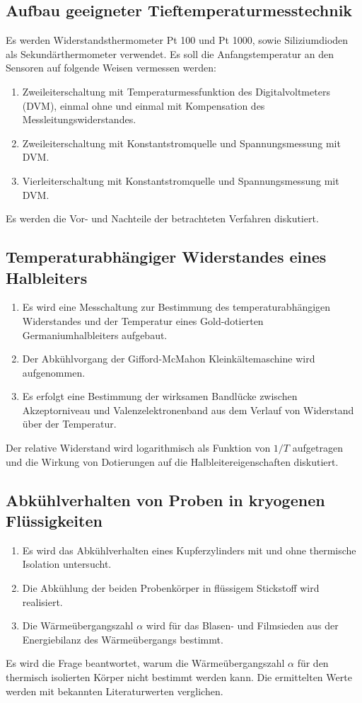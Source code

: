 \documentclass[parskip=half, a4paper,twoside,final]{article}
\begin{document}
\subsection{Aufbau geeigneter Tieftemperaturmesstechnik}

Es werden Widerstandsthermometer Pt 100 und Pt 1000, sowie Siliziumdioden als Sekundärthermometer verwendet. Es soll die Anfangstemperatur an den Sensoren auf folgende Weisen vermessen werden:
\begin{enumerate}
  \item Zweileiterschaltung mit Temperaturmessfunktion des Digitalvoltmeters (DVM), einmal ohne und einmal mit Kompensation des Messleitungswiderstandes.
  \item Zweileiterschaltung mit Konstantstromquelle und Spannungsmessung mit DVM.
  \item Vierleiterschaltung mit Konstantstromquelle und Spannungsmessung mit DVM.
\end{enumerate}

Es werden die Vor- und Nachteile der betrachteten Verfahren diskutiert.

\subsection{Temperaturabhängiger Widerstandes eines Halbleiters}

\begin{enumerate}
  \item Es wird eine Messchaltung zur Bestimmung des temperaturabhängigen Widerstandes und der Temperatur eines Gold-dotierten Germaniumhalbleiters aufgebaut.
  \item Der Abkühlvorgang der Gifford-McMahon Kleinkältemaschine wird aufgenommen.
  \item Es erfolgt eine Bestimmung der wirksamen Bandlücke zwischen Akzeptorniveau und Valenzelektronenband aus dem Verlauf von Widerstand über der Temperatur.
\end{enumerate}
Der relative Widerstand wird logarithmisch als Funktion von $1/T$ aufgetragen und die Wirkung von Dotierungen auf die Halbleitereigenschaften diskutiert.

\subsection{Abkühlverhalten von Proben in kryogenen Flüssigkeiten}
\begin{enumerate}
  \item Es wird das Abkühlverhalten eines Kupferzylinders mit und ohne thermische Isolation untersucht.
  \item Die Abkühlung der beiden Probenkörper in flüssigem Stickstoff wird realisiert.
  \item Die Wärmeübergangszahl $\alpha$ wird für das Blasen- und Filmsieden aus der Energiebilanz des Wärmeübergangs bestimmt.
\end{enumerate}
Es wird die Frage beantwortet, warum die Wärmeübergangszahl $\alpha$ für den thermisch isolierten Körper nicht bestimmt werden kann. Die ermittelten Werte werden mit bekannten Literaturwerten verglichen.
\end{document}
